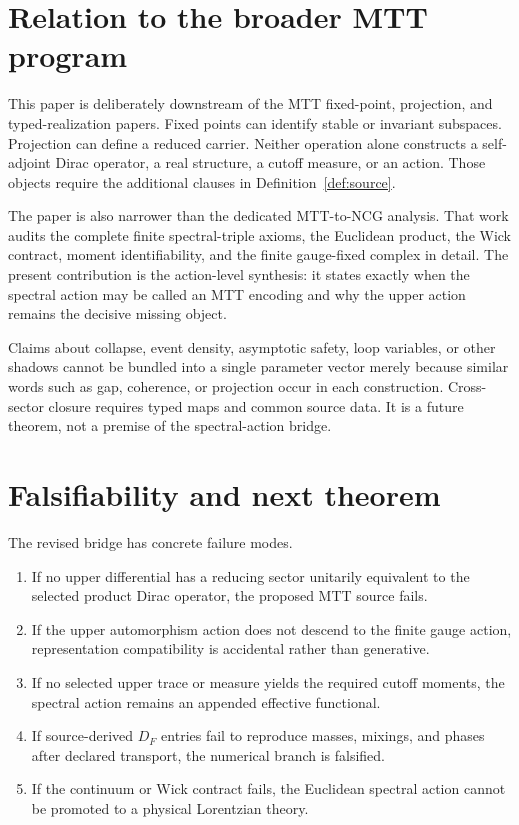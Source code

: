 \documentclass[11pt]{article}
\newcommand{\DF}{D_F}
\begin{document}
\section{Relation to the broader MTT program}

This paper is deliberately downstream of the MTT fixed-point, projection, and
typed-realization papers.  Fixed points can identify stable or invariant
subspaces.  Projection can define a reduced carrier.  Neither operation alone
constructs a self-adjoint Dirac operator, a real structure, a cutoff measure,
or an action.  Those objects require the additional clauses in
Definition~\ref{def:source}.

The paper is also narrower than the dedicated MTT-to-NCG analysis.  That work
audits the complete finite spectral-triple axioms, the Euclidean product, the
Wick contract, moment identifiability, and the finite gauge-fixed complex in
detail.  The present contribution is the action-level synthesis: it states
exactly when the spectral action may be called an MTT encoding and why the
upper action remains the decisive missing object.

Claims about collapse, event density, asymptotic safety, loop variables, or
other shadows cannot be bundled into a single parameter vector merely because
similar words such as gap, coherence, or projection occur in each construction.
Cross-sector closure requires typed maps and common source data.  It is a
future theorem, not a premise of the spectral-action bridge.

\section{Falsifiability and next theorem}

The revised bridge has concrete failure modes.
\begin{enumerate}
\item If no upper differential has a reducing sector unitarily equivalent to
the selected product Dirac operator, the proposed MTT source fails.
\item If the upper automorphism action does not descend to the finite gauge
action, representation compatibility is accidental rather than generative.
\item If no selected upper trace or measure yields the required cutoff moments,
the spectral action remains an appended effective functional.
\item If source-derived $\DF$ entries fail to reproduce masses, mixings, and
phases after declared transport, the numerical branch is falsified.
\item If the continuum or Wick contract fails, the Euclidean spectral action
cannot be promoted to a physical Lorentzian theory.
\end{enumerate}
\end{document}
